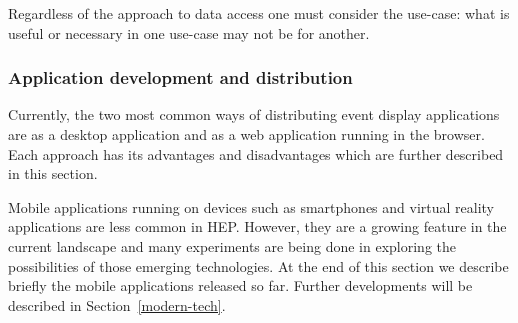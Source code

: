 \documentclass[12pt,a4paper]{article}
\begin{document}
Regardless of the approach to data access one must consider the use-case: what is useful or necessary in one use-case may not
be for another.






\hypertarget{application-development}{%
\subsubsection{Application development and distribution}\label{application-development}}

Currently, the two most common ways of distributing event display applications are as a desktop application and as a web
application running in the browser. Each approach has its advantages and disadvantages which are further described in this section.

Mobile applications running on devices such as smartphones and virtual reality applications are less common in HEP. However, they are a growing feature in the current landscape and many experiments are being done in exploring the possibilities of those emerging technologies. At the end of this section we describe briefly the mobile applications released so far. Further developments will be described in
Section~\ref{modern-tech}.
\end{document}
